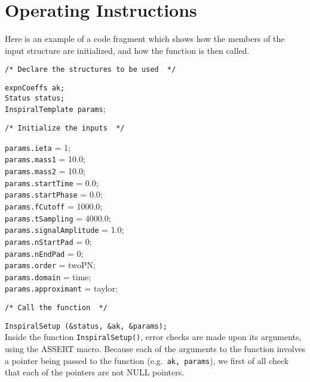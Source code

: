 \documentclass[12pt]{article}
\begin{document}
\vspace{5mm}


\section{Operating Instructions}

Here is an example of a code fragment which shows how the members of the input structure are initialized, and how the function is then called.


\vspace{5mm}

\noindent
\begin{verbatim}
/* Declare the structures to be used  */
\end{verbatim}
\texttt{expnCoeffs ak;} \\
\texttt{Status status;} \\
\texttt{InspiralTemplate params};
\begin{verbatim}
/* Initialize the inputs  */
\end{verbatim}
\texttt{params.ieta} = 1; \\
\texttt{params.mass1} = 10.0; \\
\texttt{params.mass2} = 10.0; \\
\texttt{params.startTime} = 0.0; \\
\texttt{params.startPhase} = 0.0; \\
\texttt{params.fCutoff} = 1000.0; \\
\texttt{params.tSampling} = 4000.0; \\
\texttt{params.signalAmplitude} = 1.0; \\
\texttt{params.nStartPad} = 0; \\
\texttt{params.nEndPad} = 0; \\
\texttt{params.order} = twoPN; \\
\texttt{params.domain} = time; \\
\texttt{params.approximant} = taylor;

\begin{verbatim}
/* Call the function  */
\end{verbatim}
\texttt{InspiralSetup (\&status, \&ak, \&params);} \\



Inside the function \texttt{InspiralSetup()}, error checks are made upon its arguments, using the ASSERT macro. Because each of the arguments to the function involves a pointer being passed to the function (e.g.\ \texttt{ak, params}), we first of all check that each of the pointers are not NULL pointers.
\end{document}
